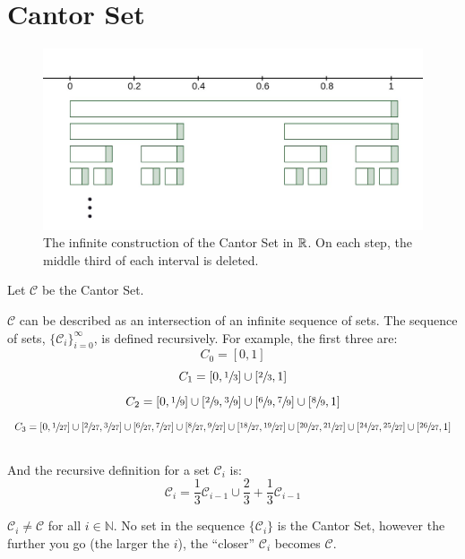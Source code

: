 \documentclass[11pt]{ekblite}
\begin{document}
\section{Cantor Set}
	\begin{figure}[h]
		\includegraphics[scale=0.3]{img/c20.jpg}
		\caption{The infinite construction of the Cantor Set in $\mathbb{R}$. On each step, the middle third of each interval is deleted.}
	\end{figure}
	Let $\mathcal{C}$ be the Cantor Set.
	\begin{definition}
        $\mathcal{C}$ can be described as an intersection of an infinite sequence of sets. The sequence of sets, $\{\mathcal{C}_i\}_{i=0}^{\infty}$, is defined recursively. For example, the first three are:
		\[C_0 = [0,1]\]
		\[C_1 = \left[0,\sfrac{1}{3}  \right] \cup \left[ \sfrac{2}{3},1\right]\]
		\[C_2 = \left[0,\sfrac{1}{9}  \right] \cup \left[ \sfrac{2}{9},\sfrac{3}{9} \right] \cup \left[\sfrac{6}{9},\sfrac{7}{9}\right] \cup \left[ \sfrac{8}{9},1\right]\]
		\[C_3 = \left[0,\sfrac{1}{27}  \right] \cup \left[\sfrac{2}{27},\sfrac{3}{27}  \right] \cup \left[\sfrac{6}{27},\sfrac{7}{27}  \right] \cup \left[\sfrac{8}{27},\sfrac{9}{27}  \right] \cup \left[\sfrac{18}{27},\sfrac{19}{27}  \right] \cup \left[\sfrac{20}{27},\sfrac{21}{27}  \right] \cup \left[\sfrac{24}{27},\sfrac{25}{27}  \right] \cup \left[\sfrac{26}{27},1  \right]\]
		\\
		And the recursive definition for a set $\mathcal{C}_i$ is:
		\[\mathcal{C}_i = \frac{1}{3}  \mathcal{C}_{i-1} \cup \frac{2}{3} + \frac{1}{3} \mathcal{C}_{i-1}\]
	\end{definition}
	\begin{corollary}
		$\mathcal{C}_i \ne \mathcal{C}$ for all $i \in \mathbb{N}$. No set in the sequence $\{\mathcal{C}_i\}$ is the Cantor Set, however the further you go (the larger the $i$), the ``closer'' $\mathcal{C}_i$ becomes $\mathcal{C}$. 
	\end{corollary}
\end{document}
